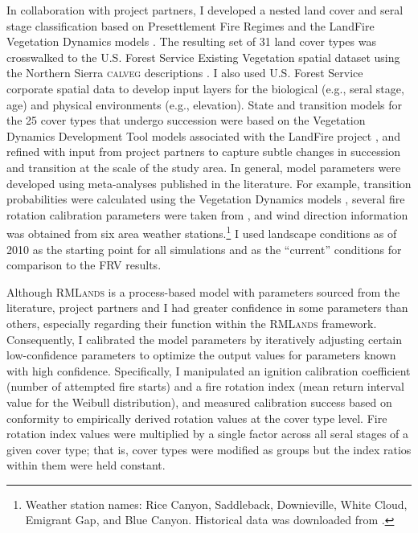 

In collaboration with project partners, I developed a nested land cover and seral stage classification based on Presettlement Fire Regimes \citep{VandeWater2011} and the LandFire Vegetation Dynamics models \citep{Landfire2007}. The resulting set of 31 land cover types was crosswalked to the U.S. Forest Service Existing Vegetation spatial dataset \citep{USDAForestService2009} using the Northern Sierra \textsc{calveg} descriptions \citep{USDAForestService2008}. I also used U.S. Forest Service corporate spatial data to develop input layers for the biological (e.g., seral stage, age) and physical environments (e.g., elevation). State and transition models for the 25 cover types that undergo succession were based on the Vegetation Dynamics Development Tool models associated with the LandFire project \citep{Landfire2007}, and refined with input from project partners to capture subtle changes in succession and transition at the scale of the study area. In general, model parameters were developed using meta-analyses published in the literature. For example, transition probabilities were calculated using the Vegetation Dynamics models \citep{Landfire2007}, several fire rotation calibration parameters were taken from \citet{Mallek2013}, and wind direction information was obtained from six area weather stations.\footnote{Weather station names: Rice Canyon, Saddleback, Downieville, White Cloud, Emigrant Gap, and Blue Canyon. Historical data was downloaded from .} I used landscape conditions as of 2010 as the starting point for all simulations and as the ``current'' conditions for comparison to the FRV results.

Although \textsc{RMLands} is a process-based model with parameters sourced from the literature, project partners and I had greater confidence in some parameters than others, especially regarding their function within the \textsc{RMLands} framework. Consequently, I calibrated the model parameters by iteratively adjusting certain low-confidence parameters to optimize the output values for parameters known with high confidence. Specifically, I manipulated an ignition calibration coefficient (number of attempted fire starts) and a fire rotation index (mean return interval value for the Weibull distribution), and measured calibration success based on conformity to empirically derived rotation values at the cover type level. Fire rotation index values were multiplied by a single factor across all seral stages of a given cover type; that is, cover types were modified as groups but the index ratios within them were held constant.

